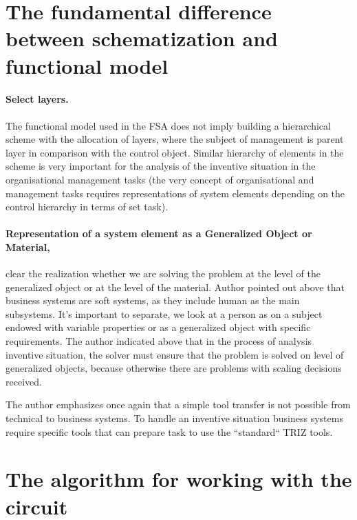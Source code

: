 \documentclass[11pt,a4paper]{book}
\begin{document}
\section{The fundamental difference between schematization and functional
  model} 

\paragraph{Select layers.}
The functional model used in the FSA does not imply building a hierarchical
scheme with the allocation of layers, where the subject of management is
parent layer in comparison with the control object. Similar hierarchy of
elements in the scheme is very important for the analysis of the inventive
situation in the organisational management tasks (the very concept of
organisational and management tasks requires representations of system
elements depending on the control hierarchy in terms of set task).

\paragraph{Representation of a system element as a Generalized Object or Material,}
clear the realization whether we are solving the problem at the level of the
generalized object or at the level of the material. Author pointed out above that business
systems are soft systems, as they include human as the main subsystems. It’s
important to separate, we look at a person as on a subject endowed with
variable properties or as a generalized object with specific requirements. The author
indicated above that in the process of analysis inventive situation, the
solver must ensure that the problem is solved on level of generalized objects, because
otherwise there are problems with scaling decisions received.

The author emphasizes once again that a simple tool transfer is not possible
from technical to business systems. To handle an inventive situation business
systems require specific tools that can prepare task to use the “standard“
TRIZ tools.

\section{The algorithm for working with the circuit}
\end{document}

